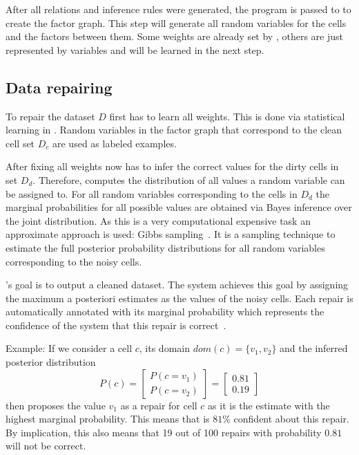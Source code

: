   \bigskip
  After all relations and inference rules were generated, the \ddlog{} program is passed to \deepdive{} to create the factor graph.
  This step will generate all random variables for the cells and the factors between them.
  Some weights are already set by \holoclean{}, others are just represented by variables and will be learned in the next step.
  
  \subsection{Data repairing}
  To repair the dataset $D$ \holoclean{} first has to learn all weights.
  This is done via statistical learning in \deepdive{}.
  Random variables in the factor graph that correspond to the clean cell set $D_c$ are used as labeled examples.
  
  After fixing all weights \holoclean{} now has to infer the correct values for the dirty cells in set $D_d$.
  Therefore, \holoclean{} computes the distribution of all values a random variable can be assigned to.
  For all random variables corresponding to the cells in $D_d$ the marginal probabilities for all possible values are obtained via Bayes inference over the joint distribution.
  As this is a very computational expensive task an approximate approach is used: Gibbs sampling~\cite{gibbssampling}.
  It is a sampling technique to estimate the full posterior probability distributions for all random variables corresponding to the noisy cells.
  
  \holoclean{}'s goal is to output a cleaned dataset.
  The system achieves this goal by assigning the maximum a posteriori estimates as the values of the noisy cells.
  Each repair is automatically annotated with its marginal probability which represents the confidence of the system that this repair is correct~\cite{holoclean}. 
  
  Example: If we consider a cell $c$, its domain $dom(c)=\{v_1, v_2\}$ and the inferred posterior distribution
  \begin{equation}
    P(c) =
    \begin{bmatrix}
      P(c = v_1)\\
      P(c = v_2)
    \end{bmatrix} = 
    \begin{bmatrix}
      0.81\\
      0.19
    \end{bmatrix}
  \end{equation}
  then \holoclean{} proposes the value $v_1$ as a repair for cell $c$ as it is the estimate with the highest marginal probability.
  This means that \holoclean{} is $81\%$ confident about this repair.
  By implication, this also means that 19 out of 100 repairs with probability $0.81$ will not be correct.

